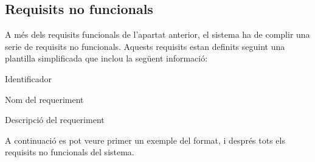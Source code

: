 \subsection{Requisits no funcionals}

A més dels requisits funcionals de l'apartat anterior, el sistema ha de complir una serie de requisits no funcionals. Aquests requisits estan definits seguint una plantilla simplificada que inclou la següent informació:

\begin{compactitem}
    \item Identificador
    \item Nom del requeriment
    \item Descripció del requeriment
\end{compactitem}

A continuació es pot veure primer un exemple del format, i després tots els requisits no funcionals del sistema.



\newcommand{\pintarRequisit}[2]{
    \pintarRequisitBox{\arabic{numeroRequisit}}{#1}{#2}
    \stepcounter{numeroRequisit}
}

\newcommand{\pintarRequisitBox}[3]{
    \begin{table}[ht]
        \setlength{\arrayrulewidth}{0.5mm}
        \arrayrulecolor{colorBorder}
        \begin{tabularx}{\linewidth}{ | l | l | }
           \hline
            \cellcolor{colorCell}\textit{\textbf{ReqNF. \#:}} & #1 \\ \hline
            \multicolumn{2}{|X|}{\cellcolor{colorCell}\textit{\textbf{Nom:}}} \\ \hline
            \multicolumn{2}{|X|}{#2} \\ \hline
            \multicolumn{2}{|X|}{\cellcolor{colorCell}\textit{\textbf{Descripció:}}} \\ \hline
            \multicolumn{2}{|X|}{#3} \\ \hline
        \end{tabularx}
    \end{table}
    \FloatBarrier
    \arrayrulecolor{colorBorderDefecte}
}



\def\arraystretch{1.5}

